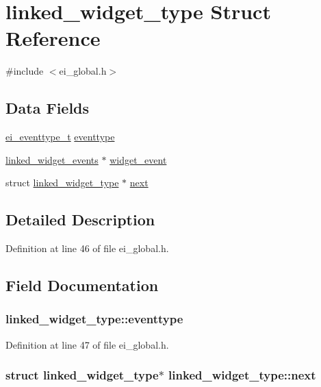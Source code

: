 \hypertarget{structlinked__widget__type}{
\section{linked\_\-widget\_\-type Struct Reference}
\label{structlinked__widget__type}
}


{\ttfamily \#include $<$ei\_\-global.h$>$}\subsection*{Data Fields}
\begin{DoxyCompactItemize}
\item 
\hyperlink{ei__event_8h_a132dde064150d861ad24e9d839cbe007}{ei\_\-eventtype\_\-t} \hyperlink{structlinked__widget__type_abe94fc24aa0fa29740c979c565ee582b}{eventtype}
\item 
\hyperlink{structlinked__widget__events}{linked\_\-widget\_\-events} $\ast$ \hyperlink{structlinked__widget__type_ac6368eed48433643c6ce5d2ce9cf6878}{widget\_\-event}
\item 
struct \hyperlink{structlinked__widget__type}{linked\_\-widget\_\-type} $\ast$ \hyperlink{structlinked__widget__type_a1d203229103394843168deeb5980840d}{next}
\end{DoxyCompactItemize}


\subsection{Detailed Description}


Definition at line 46 of file ei\_\-global.h.

\subsection{Field Documentation}
\hypertarget{structlinked__widget__type_abe94fc24aa0fa29740c979c565ee582b}{
\subsubsection[{eventtype}]{ {\bf linked\_\-widget\_\-type::eventtype}}}
\label{structlinked__widget__type_abe94fc24aa0fa29740c979c565ee582b}


Definition at line 47 of file ei\_\-global.h.\hypertarget{structlinked__widget__type_a1d203229103394843168deeb5980840d}{
\subsubsection[{next}]{\setlength{\rightskip}{0pt plus 5cm}struct {\bf linked\_\-widget\_\-type}$\ast$ {\bf linked\_\-widget\_\-type::next}}}
\label{structlinked__widget__type_a1d203229103394843168deeb5980840d}


